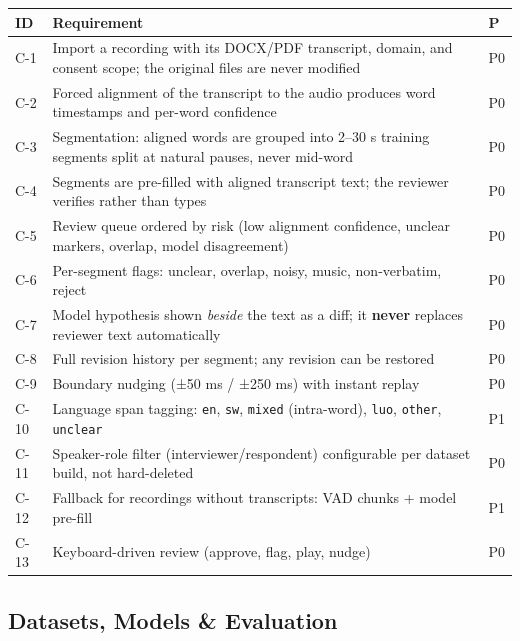 \documentclass[11pt]{article}
\begin{document}
\begin{longtable}[]{@{}>{\raggedright\arraybackslash}p{}>{\raggedright\arraybackslash}p{}>{\raggedright\arraybackslash}p{}@{}}
\toprule\noalign{}
ID & Requirement & P \\
\midrule\noalign{}
\endhead
\bottomrule\noalign{}
\endlastfoot
C-1 & Import a recording with its DOCX/PDF transcript, domain, and consent scope; the original files are never modified & P0 \\
C-2 & Forced alignment of the transcript to the audio produces word timestamps and per-word confidence & P0 \\
C-3 & Segmentation: aligned words are grouped into 2--30 s training segments split at natural pauses, never mid-word & P0 \\
C-4 & Segments are pre-filled with aligned transcript text; the reviewer verifies rather than types & P0 \\
C-5 & Review queue ordered by risk (low alignment confidence, unclear markers, overlap, model disagreement) & P0 \\
C-6 & Per-segment flags: unclear, overlap, noisy, music, non-verbatim, reject & P0 \\
C-7 & Model hypothesis shown \emph{beside} the text as a diff; it \textbf{never} replaces reviewer text automatically & P0 \\
C-8 & Full revision history per segment; any revision can be restored & P0 \\
C-9 & Boundary nudging (±50 ms / ±250 ms) with instant replay & P0 \\
C-10 & Language span tagging: \texttt{en}, \texttt{sw}, \texttt{mixed} (intra-word), \texttt{luo}, \texttt{other}, \texttt{unclear} & P1 \\
C-11 & Speaker-role filter (interviewer/respondent) configurable per dataset build, not hard-deleted & P0 \\
C-12 & Fallback for recordings without transcripts: VAD chunks + model pre-fill & P1 \\
C-13 & Keyboard-driven review (approve, flag, play, nudge) & P0 \\
\end{longtable}

\hypertarget{datasets-models--evaluation}{%
\subsection{Datasets, Models \& Evaluation}\label{datasets-models--evaluation}}
\end{document}
